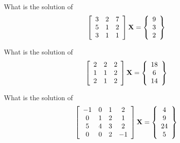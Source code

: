 \bexo

What is the solution of 
\begin{equation*}
\left[
\begin{array}{ccc}
3 & 2&7 \\
5 & 1&2\\
3&1& 1
\end{array}
\right]
\textbf{X}=
\left\{
\begin{array}{c}
9 \\
3\\
2
\end{array}
\right\}
\end{equation*}
\eexo{}

\bexo

What is the solution of 
\begin{equation*}
\left[
\begin{array}{ccc}
2 & 2&2 \\
1 & 1&2\\
2&1& 2
\end{array}
\right]
\textbf{X}=
\left\{
\begin{array}{c}
18 \\
6\\
14
\end{array}
\right\}
\end{equation*}
\eexo{}



\bexo

What is the solution of 
\begin{equation*}
\left[
\begin{array}{cccc}
-1 & 0&1&2 \\
0 & 1&2&1\\
5&4&3&2\\
0&0&2&-1
\end{array}
\right]
\textbf{X}=
\left\{
\begin{array}{c}
4 \\
9\\
24\\
5
\end{array}
\right\}
\end{equation*}
\eexo{}




